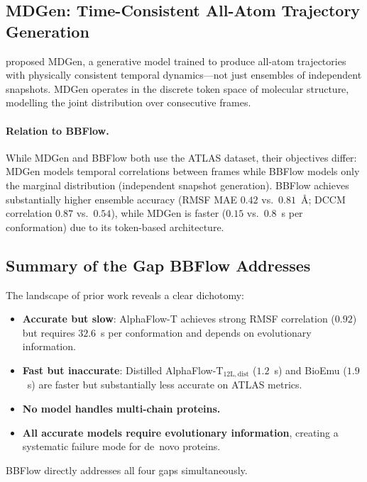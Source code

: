 \documentclass[12pt,a4paper]{article}
\begin{document}
\subsection{MDGen: Time-Consistent All-Atom Trajectory Generation}
\label{sec:mdgen}

\citet{jing2024mdgen} proposed MDGen, a generative model trained to produce all-atom
trajectories with physically consistent temporal dynamics---not just ensembles of independent
snapshots.  MDGen operates in the discrete token space of molecular structure, modelling
the joint distribution over consecutive frames.

\paragraph{Relation to BBFlow.}
While MDGen and BBFlow both use the ATLAS dataset, their objectives differ: MDGen models
temporal correlations between frames while BBFlow models only the marginal distribution
(independent snapshot generation).  BBFlow achieves substantially higher ensemble accuracy
(RMSF MAE $0.42$ vs.\ $0.81$~Å; DCCM correlation $0.87$ vs.\ $0.54$), while MDGen is
faster ($0.15$ vs.\ $0.8$~s per conformation) due to its token-based architecture.

\subsection{Summary of the Gap BBFlow Addresses}
\label{sec:gap}

The landscape of prior work reveals a clear dichotomy:
\begin{itemize}
  \item \textbf{Accurate but slow}: AlphaFlow-T achieves strong RMSF correlation ($0.92$) but
    requires $32.6$~s per conformation and depends on evolutionary information.
  \item \textbf{Fast but inaccurate}: Distilled AlphaFlow-T$_{12\mathrm{L,dist}}$ ($1.2$~s) and
    BioEmu ($1.9$~s) are faster but substantially less accurate on ATLAS metrics.
  \item \textbf{No model handles multi-chain proteins.}
  \item \textbf{All accurate models require evolutionary information}, creating a systematic
    failure mode for de~novo proteins.
\end{itemize}
BBFlow directly addresses all four gaps simultaneously.
\end{document}
